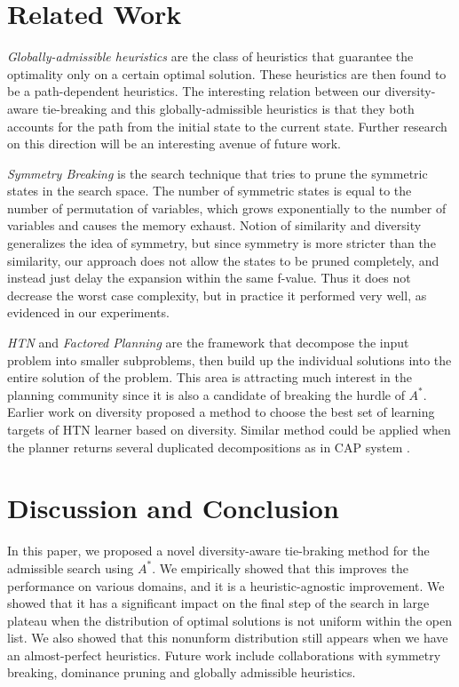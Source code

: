 \section{Related Work}
\label{sec-4}
\emph{Globally-admissible heuristics} \cite{karpas2012optimal} are the class of heuristics that guarantee the optimality only on a certain optimal solution. These heuristics are then found to be a path-dependent heuristics. The interesting relation between our diversity-aware tie-breaking and this globally-admissible heuristics is that they both accounts for the path from the initial state to the current state. Further research on this direction will be an interesting avenue of  future work.

\emph{Symmetry Breaking} \cite{Fox1998,pochter2011exploiting,domshlak2013symmetry} is the search technique that tries to prune the symmetric states in the search space. The number of symmetric states is equal to the number of permutation of variables, which grows exponentially to the number of variables and causes the memory exhaust. Notion of similarity and diversity generalizes the idea of symmetry, but since symmetry is more stricter than the similarity, our approach does not allow the states to be pruned completely, and instead just delay the expansion within the same f-value. Thus it does not decrease the worst case complexity, but in practice it performed very well, as evidenced in our experiments.

\emph{HTN} \cite{erol1994} and \emph{Factored Planning} \cite{amir2003factored,brafman2006factored,Asai2015} are the framework that decompose the input problem into smaller subproblems, then build up the individual solutions into the entire solution of the problem. This area is attracting much interest in the planning community since it is also a candidate of breaking the hurdle of $A^*$. Earlier work on diversity \cite{goldman2015measuring} proposed a method to choose the best set of learning targets of HTN learner based on diversity. Similar method could be applied when the planner returns several duplicated decompositions as in CAP system \cite{Asai2015}.


\section{Discussion and Conclusion}

In this paper, we proposed a novel diversity-aware tie-braking method for the admissible search using $A^*$. We empirically showed that this improves the performance on various domains, and it is a heuristic-agnostic improvement. We showed that it has a significant impact on the final step of the search in large plateau when the distribution of optimal solutions is not uniform within the open list. We also showed that this nonunform distribution still appears when we have an almost-perfect heuristics. Future work include collaborations with symmetry breaking, dominance pruning and globally admissible heuristics.


